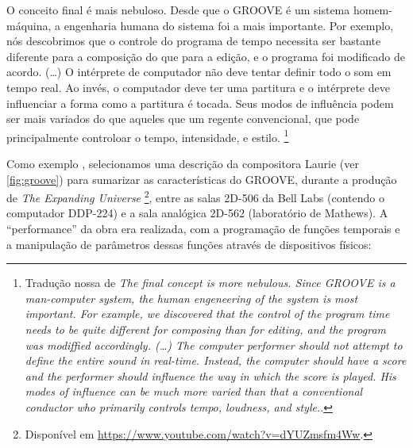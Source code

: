 \begin{citacao} 
O conceito final é mais nebuloso. Desde que o GROOVE é um sistema homem-máquina, a engenharia humana do sistema foi a mais importante. Por exemplo, nós descobrimos que o controle do programa de tempo necessita ser bastante diferente para a composição do que para a edição, e o programa foi modificado de acordo. (\ldots) O intérprete de computador não deve tentar definir todo o som em tempo real. Ao invés, o computador deve ter uma partitura e o intérprete deve influenciar a forma como a partitura é tocada. Seus modos de influência podem ser mais variados do que aqueles que um regente convencional, que pode principalmente controloar o tempo, intensidade, e estilo.\cite[p.~715-716]{mathews_groove_1970}
\footnote{Tradução nossa de \emph{The final concept is more nebulous. Since GROOVE is a man-computer system, the human engeneering of the system is most important. For example, we discovered that the control of the program time needs to be quite different for composing than for editing, and the program was modiffied accordingly. (\ldots) The computer performer should not attempt to define the entire sound in real-time. Instead, the computer should have a score and the performer should influence the way in which the score is played. His modes of influence can be much more varied than that a conventional conductor who primarily controls tempo, loudness, and style.}.}
\end{citacao}

Como exemplo , selecionamos uma descrição da compositora Laurie  (ver \autoref{fig:groove}) para sumarizar as características do GROOVE, durante a produção de \emph{The Expanding Universe} \footnote{Disponível em \url{https://www.youtube.com/watch?v=dYUZmsfm4Ww}.}, entre as salas 2D-506 da Bell Labs (contendo o computador DDP-224) e a sala analógica 2D-562 (laboratório de Mathews). A ``performance'' da obra era realizada, com a programação de funções temporais e a manipulação de parâmetros dessas funções através de dispositivos físicos:

